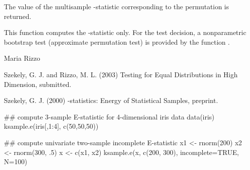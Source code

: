 \documentclass{article}
\begin{document}
\begin{Value}
The value of the multisample -statistic corresponding to
the permutation  is returned.\end{Value}
\begin{Note}\relax
This function computes the -statistic only. 
For the test decision,
a nonparametric bootstrap test (approximate permutation test)
is provided by the function .
\end{Note}
\begin{Author}\relax
Maria Rizzo 
\end{Author}
\begin{References}\relax
Szekely, G. J. and Rizzo, M. L. (2003) Testing for Equal
Distributions in High Dimension, submitted.

Szekely, G. J. (2000) -statistics: Energy of 
Statistical Samples, preprint.\end{References}
\begin{SeeAlso}\relax
{}
\end{SeeAlso}
\begin{Examples}
\begin{ExampleCode}
## compute 3-sample E-statistic for 4-dimensional iris data
 data(iris)
 ksample.e(iris[,1:4], c(50,50,50))

## compute univariate two-sample incomplete E-statistic
 x1 <- rnorm(200)
 x2 <- rnorm(300, .5)
 x <- c(x1, x2)
 ksample.e(x, c(200, 300), incomplete=TRUE, N=100)
 
\end{ExampleCode}
\end{Examples}
\end{document}
